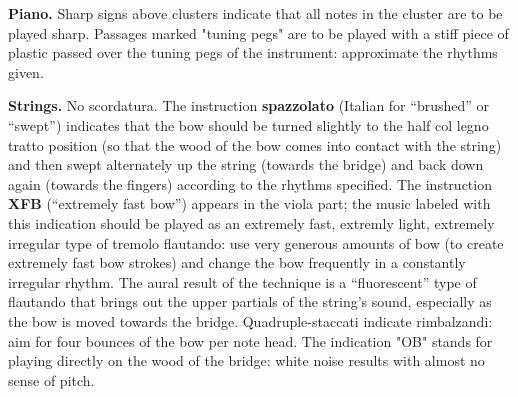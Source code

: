 \textbf{Piano.} Sharp signs above clusters indicate that all notes in the
cluster are to be played sharp. Passages marked "tuning pegs" are to be played
with a stiff piece of plastic passed over the tuning pegs of the instrument:
approximate the rhythms given.

\textbf{Strings.} No scordatura. The instruction \textbf{spazzolato} (Italian
for ``brushed'' or ``swept'') indicates that the bow should be turned slightly
to the half col legno tratto position (so that the wood of the bow comes into
contact with the string) and then swept alternately up the string (towards the
bridge) and back down again (towards the fingers) according to the rhythms
specified. The instruction \textbf{XFB} (``extremely fast bow'') appears in the
viola part; the music labeled with this indication should be played as an
extremely fast, extremly light, extremely irregular type of tremolo flautando:
use very generous amounts of bow (to create extremely fast bow strokes) and
change the bow frequently in a constantly irregular rhythm. The aural result of
the technique is a ``fluorescent'' type of flautando that brings out the upper
partials of the string's sound, especially as the bow is moved towards the
bridge. Quadruple-staccati indicate rimbalzandi: aim for four bounces of the
bow per note head. The indication "OB" stands for playing directly on the wood
of the bridge: white noise results with almost no sense of pitch.
